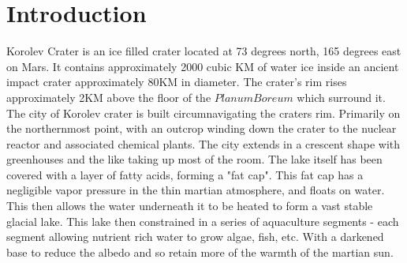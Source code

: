 \documentclass[10pt]{article}
\begin{document}
\section*{Introduction}
Korolev Crater is an ice filled crater located at 73 degrees north, 165 degrees east on Mars. It contains approximately 2000 cubic KM of water ice inside an ancient impact crater approximately 80KM in diameter. The crater's rim rises approximately 2KM above the floor of the $Planum Boreum$ which surround it.  The city of Korolev crater is built circumnavigating the craters rim. Primarily on the northernmost point, with an outcrop winding down the crater to the nuclear reactor and associated chemical plants. The city extends in a crescent shape with greenhouses and the like taking up most of the room. The lake itself has been covered with a layer of fatty acids, forming a "fat cap". This fat cap has a negligible vapor pressure in the thin martian atmosphere, and floats on water. This then allows the water underneath it to be heated to form a vast stable glacial lake. This lake then constrained in a series of aquaculture segments - each segment allowing nutrient rich water to grow algae, fish, etc. With a darkened base to reduce the albedo and so retain more of the warmth of the martian sun.
\end{document}
